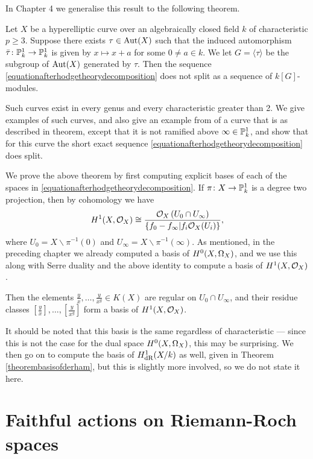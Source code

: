 In Chapter 4 we generalise this result to the following theorem.
    \begin{unnumthm}
    Let $X$ be a hyperelliptic curve over an algebraically closed field $k$ of characteristic $p \geq 3$.
    Suppose there exists $\tau \in \operatorname{Aut}(X)$ such that the induced automorphism $\bar \tau \colon \mathbb P_k^1 \rightarrow \mathbb P_k^1$ is given by $x \mapsto x+a$ for some $0 \neq a \in k$.
    We let $G = \langle \tau \rangle$ be the subgroup of $\operatorname{Aut}(X)$ generated by $\tau$.
    Then the sequence \eqref{equationafterhodgetheorydecomposition} does not split as a sequence of $k[G]$-modules.
    \end{unnumthm}
Such curves exist in every genus and every characteristic greater than 2.
We give examples of such curves, and also give an example from \cite{automorphismshyperellipticmodular} of a curve that is as described in theorem, except that it is not ramified above $\infty \in {\mathbb P}_k^1$, and show that for this curve the short exact sequence \eqref{equationafterhodgetheorydecomposition} does split.

We prove the above theorem by first computing explicit bases of each of the spaces in \eqref{equationafterhodgetheorydecomposition}.
If $\pi \colon X \rightarrow {\mathbb P}_k^1$ is a degree two projection, then by \cech cohomology we have
        \[
        H^1(X,\mathcal{O}_X) \cong \frac{{\cal O}_X\left(U_0 \cap U_\infty\right)}{\{ f_0 - f_\infty | f_i {\cal O}_X(U_i)\}},
        \]
where $U_0 = X \backslash \pi^{-1}(0)$ and $U_\infty = X \backslash \pi^{-1}(\infty)$.
As mentioned, in the preceding chapter we already computed a basis of ${H^0(X,\Omega_X)}$, and we use this along with Serre duality and the above identity to compute a basis of $H^1(X,\mathcal{O}_X)$.
    \begin{unnumthm}
    Then the elements $\frac{y}{x}, \ldots, \frac{y}{x^g} \in K(X)$ are regular on $U_0 \cap U_\infty$, and their residue classes $\left [ \frac{y}{x} \right ],  \ldots, \left [ \frac{y}{x^g} \right]$ form a basis of $H^1(X,\mathcal{O}_X)$.
    \end{unnumthm}
 It should be noted that this basis is the same regardless of characteristic --- since this is not the case for the dual space ${H^0(X,\Omega_X)}$, this may be surprising.
 We then go on to compute the basis of $H_{\text {dR}}^1(X/k)$ as well, given in Theorem \ref{theorembasisofderham}, but this is slightly more involved, so we do not state it here.


 \section{Faithful actions on Riemann-Roch spaces}

